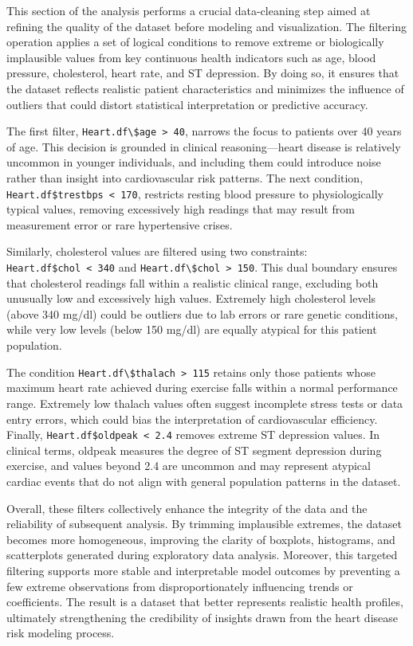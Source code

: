 \documentclass[
]{article}
\begin{document}
This section of the analysis performs a crucial data-cleaning step aimed
at refining the quality of the dataset before modeling and
visualization. The filtering operation applies a set of logical
conditions to remove extreme or biologically implausible values from key
continuous health indicators such as age, blood pressure, cholesterol,
heart rate, and ST depression. By doing so, it ensures that the dataset
reflects realistic patient characteristics and minimizes the influence
of outliers that could distort statistical interpretation or predictive
accuracy.

The first filter,
\texttt{Heart.df\textbackslash{}\$age\ \textgreater{}\ 40}, narrows the
focus to patients over 40 years of age. This decision is grounded in
clinical reasoning---heart disease is relatively uncommon in younger
individuals, and including them could introduce noise rather than
insight into cardiovascular risk patterns. The next condition,
\texttt{Heart.df\$trestbps\ \textless{}\ 170}, restricts resting blood
pressure to physiologically typical values, removing excessively high
readings that may result from measurement error or rare hypertensive
crises.

Similarly, cholesterol values are filtered using two constraints:
\texttt{Heart.df\$chol\ \textless{}\ 340} and
\texttt{Heart.df\textbackslash{}\$chol\ \textgreater{}\ 150}. This dual
boundary ensures that cholesterol readings fall within a realistic
clinical range, excluding both unusually low and excessively high
values. Extremely high cholesterol levels (above 340 mg/dl) could be
outliers due to lab errors or rare genetic conditions, while very low
levels (below 150 mg/dl) are equally atypical for this patient
population.

The condition
\texttt{Heart.df\textbackslash{}\$thalach\ \textgreater{}\ 115} retains
only those patients whose maximum heart rate achieved during exercise
falls within a normal performance range. Extremely low thalach values
often suggest incomplete stress tests or data entry errors, which could
bias the interpretation of cardiovascular efficiency. Finally,
\texttt{Heart.df\$oldpeak\ \textless{}\ 2.4} removes extreme ST
depression values. In clinical terms, oldpeak measures the degree of ST
segment depression during exercise, and values beyond 2.4 are uncommon
and may represent atypical cardiac events that do not align with general
population patterns in the dataset.

Overall, these filters collectively enhance the integrity of the data
and the reliability of subsequent analysis. By trimming implausible
extremes, the dataset becomes more homogeneous, improving the clarity of
boxplots, histograms, and scatterplots generated during exploratory data
analysis. Moreover, this targeted filtering supports more stable and
interpretable model outcomes by preventing a few extreme observations
from disproportionately influencing trends or coefficients. The result
is a dataset that better represents realistic health profiles,
ultimately strengthening the credibility of insights drawn from the
heart disease risk modeling process.
\end{document}
